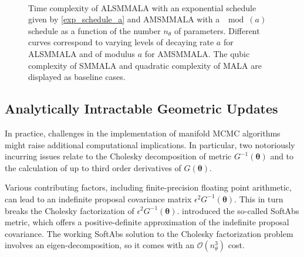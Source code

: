 \documentclass[twoside,11pt]{article}
\begin{document}
{\begin{figure}[t]
	\centering
	 \\
	\caption{
		Time complexity of ALSMMALA with an exponential schedule given by \eqref{exp_schedule_a} and AMSMMALA with a $\mod{(a)}$ 
		schedule as a function of the number $n_{\theta}$ of parameters. Different curves correspond to varying levels of 
		decaying rate $a$ for ALSMMALA and of modulus $a$ for AMSMMALA. The qubic complexity of SMMALA and quadratic complexity
		of MALA are displayed as baseline cases.
	}
	\label{fig:alsmmala_amsmmala_schedule}
\end{figure}

\subsection{Analytically Intractable Geometric Updates}

In practice, challenges in the implementation of manifold MCMC algorithms might raise additional computational implications.
In particular, two notoriously incurring issues relate to the Cholesky decomposition of metric $G^{-1}(\boldsymbol{\theta})$ 
and to the calculation of up to third order derivatives of $G(\boldsymbol{\theta})$.

Various contributing factors, including finite-precision floating point arithmetic, can lead to an indefinite proposal
covariance matrix $\epsilon^2 G^{-1}(\boldsymbol{\theta})$. This in turn breaks the Cholesky factorization of 
$\epsilon^2 G^{-1}(\boldsymbol{\theta})$. \cite{bet__age} introduced the so-called SoftAbs metric, which offers a 
positive-definite approximation of the indefinite proposal covariance. The working SoftAbs solution to the Cholesky 
factorization problem involves an eigen-decomposition, so it comes with an $\mathcal{O}(n_{\theta}^3)$ cost.

}
\end{document}
